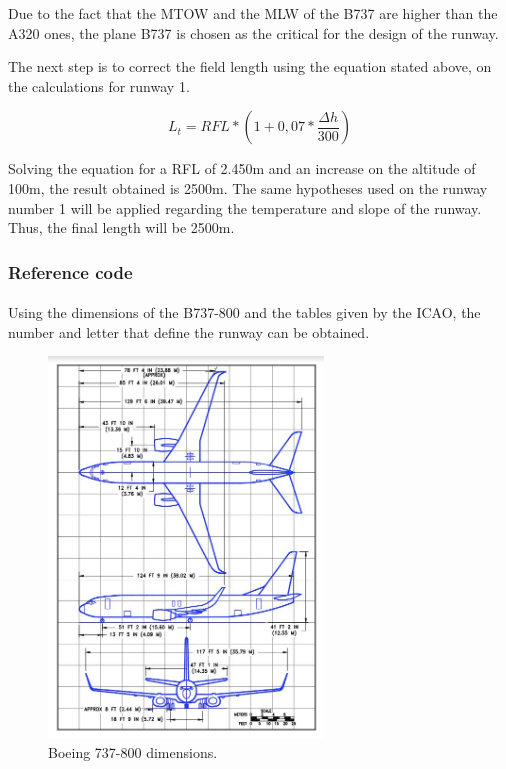 		Due to the fact that the MTOW and the MLW of the B737 are higher than the A320 ones, the plane B737 is chosen as the critical for the design of the runway. 		
		
		The next step is to correct the field length using the equation stated above, on the calculations for runway 1. 
	
		\[L_t=RFL*(1+0,07*\frac{\Delta h}{300})\]
		
		Solving the equation for a RFL of 2.450m and an increase on the altitude of 100m, the result obtained is 2500m.
		The same hypotheses used on the runway number 1 will be applied regarding the temperature and slope of the runway.  Thus, the final length will be 2500m.
		
		\subsubsection{Reference code}
		\paragraph{} Using the dimensions of the B737-800 and the tables given by the ICAO, the number and letter that define the runway can be obtained. 
		
		\begin{figure}[H]
			\centering
			\includegraphics[clip, trim=0cm 0cm 0cm 0cm, width=0.65\textwidth]{./images/B737/737}
			\caption{Boeing 737-800 dimensions.} %
			\label{} %
		\end{figure}
	
